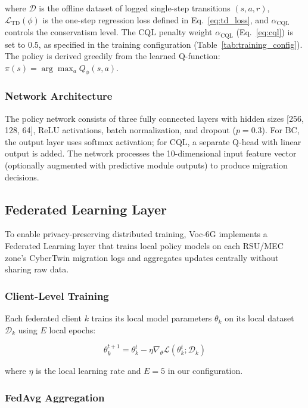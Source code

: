 \documentclass[journal,twoside]{IEEEtran}
\newcommand{\VocSixG}{Voc-6G}
\begin{document}
where $\mathcal{D}$ is the offline dataset of logged single-step transitions $(s, a, r)$, $\mathcal{L}_{\text{TD}}(\phi)$ is the one-step regression loss defined in Eq.~\ref{eq:td_loss}, and $\alpha_{\text{CQL}}$ controls the conservatism level. The CQL penalty weight $\alpha_{\text{CQL}}$ (Eq.~\ref{eq:cql}) is set to 0.5, as specified in the training configuration (Table~\ref{tab:training_config}). The policy is derived greedily from the learned Q-function: $\pi(s) = \arg\max_a Q_\phi(s, a)$.

\subsubsection{Network Architecture}

The policy network consists of three fully connected layers with hidden sizes [256, 128, 64], ReLU activations, batch normalization, and dropout ($p=0.3$). For BC, the output layer uses softmax activation; for CQL, a separate Q-head with linear output is added. The network processes the 10-dimensional input feature vector (optionally augmented with predictive module outputs) to produce migration decisions.

\subsection{Federated Learning Layer}
\label{sec:federated}

To enable privacy-preserving distributed training, \VocSixG{} implements a Federated Learning layer that trains local policy models on each RSU/MEC zone's CyberTwin migration logs and aggregates updates centrally without sharing raw data.

\subsubsection{Client-Level Training}

Each federated client $k$ trains its local model parameters $\theta_k$ on its local dataset $\mathcal{D}_k$ using $E$ local epochs:

\begin{equation}
\theta_k^{t+1} = \theta_k^t - \eta \nabla_\theta \mathcal{L}(\theta_k^t; \mathcal{D}_k)
\end{equation}

where $\eta$ is the local learning rate and $E=5$ in our configuration.

\subsubsection{FedAvg Aggregation}
\end{document}
